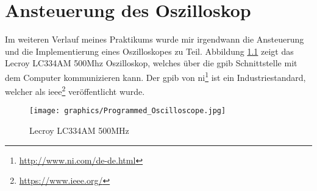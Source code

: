 \chapter{Ansteuerung des Oszilloskop}
\label{ch:osci}

Im weiteren Verlauf meines Praktikums wurde mir irgendwann die Ansteuerung und die Implementierung eines Oszilloskopes zu Teil. 
Abbildung \ref{fig:lc334am} zeigt das Lecroy LC334AM 500Mhz Oszilloskop, welches über die \ac{gpib} Schnittstelle mit dem Computer kommunizieren kann. Der \ac{gpib} von \ac{ni}\footnote{\url{http://www.ni.com/de-de.html}} ist ein Industriestandard, welcher als \ac{ieee}\footnote{\url{https://www.ieee.org/}} veröffentlicht wurde.

\begin{figure}[H]
	\centering
	\texttt{[image: graphics/Programmed\_Oscilloscope.jpg]}
	\caption{Lecroy LC334AM 500MHz}
	\label{fig:lc334am}
\end{figure}

